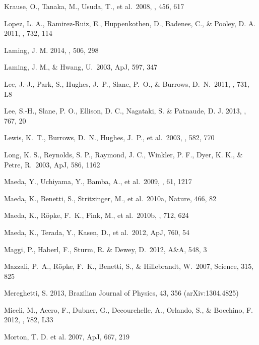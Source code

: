 \documentclass[11pt,a4paper]{article}
\begin{document}
{\begin{multicols}{2}
{\begin{thebibliography}{99}
 Krause, O., Tanaka, M., 
Usuda, T., et al.\ 2008, \nat, 456, 617 

Lopez, L. A., Ramirez-Ruiz, E., Huppenkothen, D., Badenes, C., \& Pooley, D. A. 2011,
\apj, 732, 114

Laming, J. M. 2014, \nat, 506, 298

Laming, J. M., \& Hwang, U.\ 2003, ApJ, 597, 347

 Lee, J.-J., Park, S., Hughes, J.~P.,
  Slane, P.~O., \& Burrows, D.~N.\ 2011, \apj, 731, L8

Lee, S.-H., Slane, P. O., Ellison, D. C., Nagataki, S. \& Patnaude, D. J. 2013, \apj, 767, 20

 Lewis, K.~T., Burrows, 
D.~N., Hughes, J.~P., et al.\ 2003, \apj, 582, 770 

Long, K. S., Reynolds, S. P., Raymond, J. C., Winkler, P. F., Dyer, K. K.,
\& Petre, R.\ 2003, ApJ, 586, 1162 

 Maeda, Y., Uchiyama, Y., 
Bamba, A., et al.\ 2009, \pasj, 61, 1217 

 Maeda, K., Benetti, S.,
Stritzinger, M., et al.\ 2010a, Nature, 466, 82 

 Maeda, K., R{\"o}pke, 
F.~K., Fink, M., et al.\ 2010b, \apj, 712, 624 

 Maeda, K., Terada, Y., Kasen,
  D., et al.\ 2012, ApJ, 760, 54

 Maggi, P., Haberl, F., Sturm,
  R. \& Dewey, D.\ 2012, A\&A, 548, 3

 Mazzali, P.~A., R{\"o}pke,
  F.~K., Benetti, S., \& Hillebrandt, W.\ 2007, Science, 315, 825

Mereghetti, S. 2013, Brazilian Journal of Physics, 43, 356 (arXiv:1304.4825)

Miceli, M., Acero, F., Dubner, G., Decourchelle, A., Orlando, S., \& Bocchino, F. 2012, \apj, 782, L33

Morton, T. D. et al. 2007, ApJ, 667, 219


\end{thebibliography}}
\end{multicols}}
\end{document}
